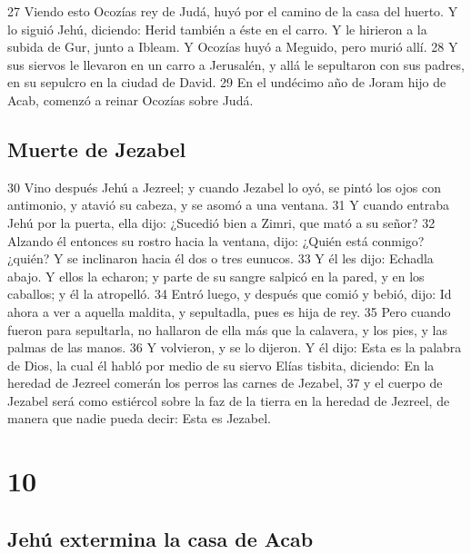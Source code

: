  
27 Viendo esto Ocozías rey de Judá, huyó por el camino de la casa del huerto. Y lo siguió Jehú, diciendo: Herid también a éste en el carro. Y le hirieron a la subida de Gur, junto a Ibleam. Y Ocozías huyó a Meguido, pero murió allí.
28 Y sus siervos le llevaron en un carro a Jerusalén, y allá le sepultaron con sus padres, en su sepulcro en la ciudad de David.
29 En el undécimo año de Joram hijo de Acab, comenzó a reinar Ocozías sobre Judá.
\section*{Muerte de Jezabel}

30 Vino después Jehú a Jezreel; y cuando Jezabel lo oyó, se pintó los ojos con antimonio, y atavió su cabeza, y se asomó a una ventana.
31 Y cuando entraba Jehú por la puerta, ella dijo: ¿Sucedió bien a Zimri, que mató a su señor?
32 Alzando él entonces su rostro hacia la ventana, dijo: ¿Quién está conmigo? ¿quién? Y se inclinaron hacia él dos o tres eunucos.
33 Y él les dijo: Echadla abajo. Y ellos la echaron; y parte de su sangre salpicó en la pared, y en los caballos; y él la atropelló.
34 Entró luego, y después que comió y bebió, dijo: Id ahora a ver a aquella maldita, y sepultadla, pues es hija de rey.
35 Pero cuando fueron para sepultarla, no hallaron de ella más que la calavera, y los pies, y las palmas de las manos.
36 Y volvieron, y se lo dijeron. Y él dijo: Esta es la palabra de Dios, la cual él habló por medio de su siervo Elías tisbita, diciendo: En la heredad de Jezreel comerán los perros las carnes de Jezabel, 
37 y el cuerpo de Jezabel será como estiércol sobre la faz de la tierra en la heredad de Jezreel, de manera que nadie pueda decir: Esta es Jezabel.

\chapter{10}

\section*{Jehú extermina la casa de Acab}


